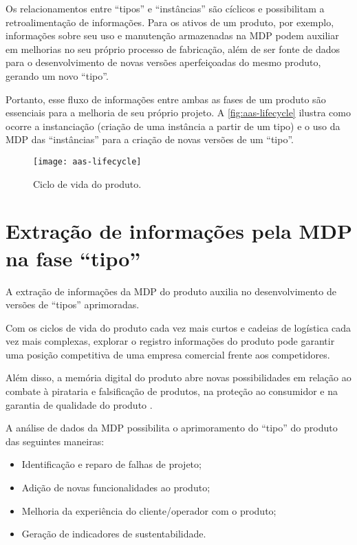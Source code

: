 	Os relacionamentos entre ``tipos'' e ``instâncias'' são cíclicos e possibilitam a retroalimentação de informações. Para os ativos de um produto, por exemplo, informações sobre seu uso e manutenção armazenadas na MDP podem auxiliar em melhorias no seu próprio processo de fabricação, além de ser fonte de dados para o desenvolvimento de novas versões aperfeiçoadas do mesmo produto, gerando um novo ``tipo''.
	
	Portanto, esse fluxo de informações entre ambas as fases de um produto são essenciais para a melhoria de seu próprio projeto. A \autoref{fig:aas-lifecycle} ilustra como ocorre a instanciação (criação de uma instância a partir de um tipo) e o uso da MDP das ``instâncias'' para a criação de novas versões de um ``tipo''.
	
	\begin{figure}[htb!]
		\centering
		\caption{Ciclo de vida do produto.}
		\label{fig:aas-lifecycle}
		\texttt{[image: aas-lifecycle]}
	\end{figure}

\section{Extração de informações pela MDP na fase ``tipo''}

	A extração de informações da MDP do produto auxilia no desenvolvimento de versões de ``tipos'' aprimoradas.

	Com os ciclos de vida do produto cada vez mais curtos e cadeias de logística cada vez mais complexas, explorar o registro informações do produto pode garantir uma posição competitiva de uma empresa comercial frente aos competidores.
	
	Além disso, a memória digital do produto abre novas possibilidades em relação ao combate à pirataria e falsificação de produtos, na proteção ao consumidor e na garantia de qualidade do produto \cite{wahlster2007digitalmemory}.
	
	A análise de dados da MDP possibilita o aprimoramento do ``tipo'' do produto das seguintes maneiras:
	
	\begin{itemize}
		\item Identificação e reparo de falhas de projeto;
		\item Adição de novas funcionalidades ao produto;
		\item Melhoria da experiência do cliente/operador com o produto;
		\item Geração de indicadores de sustentabilidade.
	\end{itemize}

